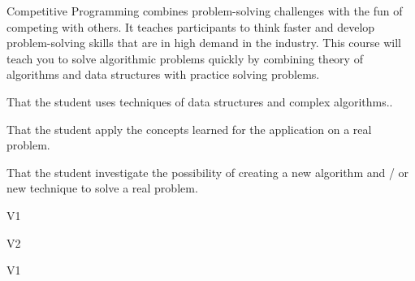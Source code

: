 \begin{syllabus}


\begin{justification}
    Competitive Programming combines problem-solving challenges with the fun of competing with others. It teaches participants to think faster and develop problem-solving skills that are in high demand in the industry.
    This course will teach you to solve algorithmic problems quickly by combining theory of algorithms and data structures with practice solving problems.
  \end{justification}
  
  \begin{goals}
    \item That the student uses techniques of data structures and complex algorithms..
    \item That the student apply the concepts learned for the application on a real problem.
    \item That the student investigate the possibility of creating a new algorithm and / or new technique to solve a real problem.
  \end{goals}
  
  \begin{outcomes}{V1}
      \item {}
      \item {}
      \item {}
  \end{outcomes}
  
  \begin{outcomes}{V2}
      \item {}
      \item {}
      \item {}
      \item {}
  \end{outcomes}
  
  \begin{competences}{V1}
      \item {}
      \item {}
      \item {}
  \end{competences}
  

\end{syllabus}
